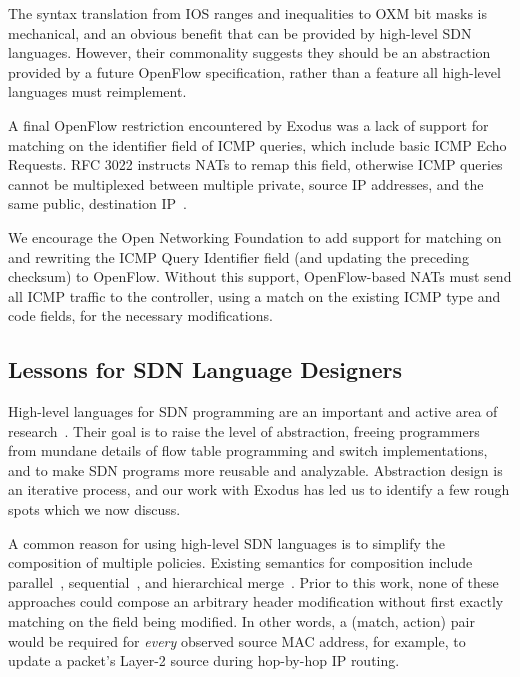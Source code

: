 The syntax translation from IOS ranges and inequalities to OXM bit masks is
mechanical, and an obvious benefit that can be provided  by high-level SDN languages.
However, their commonality suggests they should be an abstraction provided
by a future OpenFlow specification, rather than a feature all high-level languages
must reimplement.


A final OpenFlow restriction encountered by Exodus was a lack of support
for matching on the identifier field of ICMP queries, which include basic ICMP Echo
Requests. RFC 3022 instructs NATs to remap this field, otherwise ICMP
queries cannot be multiplexed between multiple private, source IP addresses,
and the same public, destination IP~\cite{rfc3022}.

We encourage the Open Networking Foundation to add support for matching
on and rewriting the ICMP Query Identifier field (and updating the preceding
checksum) to OpenFlow. Without this support, OpenFlow-based NATs
must send all ICMP traffic to the controller, using a match on the existing
ICMP type and code fields, for the necessary modifications.


\subsection{Lessons for SDN Language Designers}

High-level languages for SDN programming are an important and active
area of research~\cite{foster:icfp11-frenetic,katta:xldi12-flog,monsanto++:nsdi13-pyretic,Nelson:2014flowlog,Voellmy:2011,voellmy:hotsdn12-procera,Voellmy:2013}. Their goal is to raise the level of abstraction, freeing
programmers from mundane details of flow table programming and switch
implementations, and to make SDN programs more reusable and analyzable.
Abstraction design is an iterative process, and our work with Exodus has
led us to identify a few rough spots which we now discuss.

A common reason for using high-level SDN languages is to simplify
the composition of multiple policies. Existing semantics for composition
include parallel~\cite{foster:icfp11-frenetic}, sequential~\cite{monsanto++:nsdi13-pyretic}, and hierarchical merge~\cite{Ferguson:2013sigcomm}. %
Prior to this work, none of these approaches could compose an arbitrary
header modification without first exactly matching on the field being modified.
In other words, a (match, action) pair would be required for \emph{every} observed source
MAC address, for example, to update a packet's Layer-2 source during hop-by-hop
IP routing.


